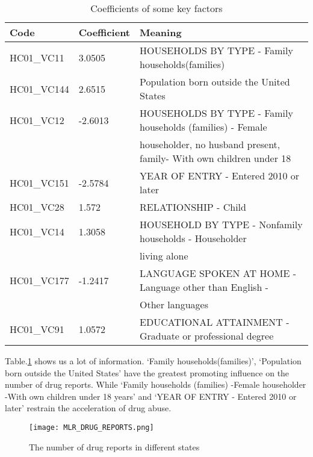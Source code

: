\documentclass{mcmthesis}
\begin{document}
      \begin{table}[!h]
      \centering
      \caption{Coefficients of some key factors} \label{tab:Coefficients}
      \begin{tabular}{lll}
      \toprule[2.5pt]
      \textbf{Code}& \textbf{Coefficient}  & \textbf{Meaning}\\
      \midrule[1.5pt]
      HC01\_VC11 & 3.0505 & HOUSEHOLDS BY TYPE - Family households(families)\\
      \midrule
      HC01\_VC144& 2.6515 & Population born outside the United States  \\
      \midrule
      HC01\_VC12& -2.6013 &  HOUSEHOLDS BY TYPE - Family households (families) - Female \\
      & &  householder, no husband present, family- With own children under 18  \\
      \midrule
      HC01\_VC151 & -2.5784 & YEAR OF ENTRY - Entered 2010 or later \\
      \midrule
      HC01\_VC28 & 1.572 & RELATIONSHIP - Child\\
      \midrule
      HC01\_VC14 & 1.3058 & HOUSEHOLD BY TYPE - Nonfamily households - Householder  \\
      \midrule 
      &  & living alone\\
      \midrule
      HC01\_VC177 & -1.2417 & LANGUAGE SPOKEN AT HOME - Language other than English - \\
      & & Other languages\\
      \midrule
      HC01\_VC91 & 1.0572 & EDUCATIONAL ATTAINMENT - Graduate or professional degree\\
      \bottomrule
      \end{tabular}
      \end{table}

      Table.\ref{tab:Coefficients} shows us a lot of information. ‘Family households(families)’, ‘Population born outside the United States’ have the greatest promoting influence on the number of drug reports. While ‘Family households (families) -Female householder -With own children under 18 years’ and ‘YEAR OF ENTRY - Entered 2010 or later’ restrain the acceleration of drug abuse.

\begin{figure}[!h]
\small
\centering
\texttt{[image: MLR\_DRUG\_REPORTS.png]}
\caption{The number of drug reports in different states} %
\end{figure}
\end{document}
